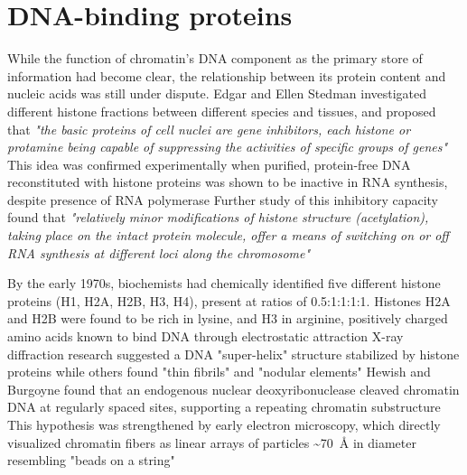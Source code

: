 \section{DNA-binding proteins}
While the function of chromatin's DNA component as the primary store of information had become clear, the relationship between its protein content and nucleic acids was still under dispute. Edgar and Ellen Stedman investigated different histone fractions between different species and tissues, and proposed that \textit{"the basic proteins of cell nuclei are gene inhibitors, each histone or protamine being capable of suppressing the activities of specific groups of genes"} This idea was confirmed experimentally when purified, protein-free DNA reconstituted with histone proteins was shown to be inactive in RNA synthesis, despite presence of RNA polymerase Further study of this inhibitory capacity found that \textit{"relatively minor modifications of histone structure (acetylation), taking place on the intact protein molecule, offer a means of switching on or off RNA synthesis at different loci along the chromosome"}

By the early 1970s, biochemists had chemically identified five different histone proteins (H1, H2A, H2B, H3, H4), present at ratios of 0.5:1:1:1:1. Histones H2A and H2B were found to be rich in lysine, and H3 in arginine, positively charged amino acids known to bind DNA through electrostatic attraction X-ray diffraction research suggested a DNA "super-helix" structure stabilized by histone proteins while others found "thin fibrils" and "nodular elements" Hewish and Burgoyne found that an endogenous nuclear deoxyribonuclease cleaved chromatin DNA at regularly spaced sites, supporting a repeating chromatin substructure This hypothesis was strengthened by early electron microscopy, which directly visualized chromatin fibers as linear arrays of particles \textasciitilde{\SI{70}{\angstrom}} in diameter resembling "beads on a string"

